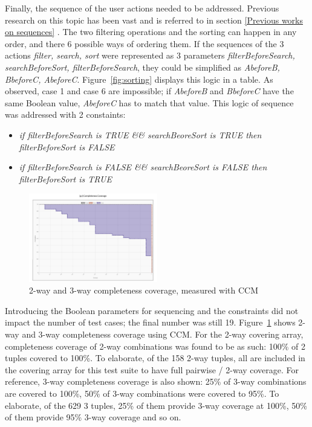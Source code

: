 \documentclass[conference]{IEEEtran}
\begin{document}
	Finally, the sequence of the user actions needed to be addressed. Previous research on this topic has been vast and is referred to in section \ref{Previous works on sequences} .
	The two filtering operations and the sorting can happen in any order, and there 6 possible ways of ordering them.
	If the sequences of the 3 actions \textit{filter, search, sort} were represented as 3 parameters \textit{filterBeforeSearch, searchBeforeSort, filterBeforeSearch}, they could be simplified as \textit{AbeforeB, BbeforeC, AbeforeC}.
	Figure~\ref{fig:sorting} displays this logic in a table.
	As observed, case 1 and case 6 are impossible; if \textit{AbeforeB} and \textit{BbeforeC} have the same Boolean value, \textit{AbeforeC} has to match that value.
	This logic of sequence was addressed with 2 constaints:

	\begin{itemize}
	\item \textit{if filterBeforeSearch is TRUE \&\& searchBeoreSort is TRUE then filterBeforeSort is FALSE}
	\item \textit{if filterBeforeSearch is FALSE \&\& searchBeoreSort is FALSE then filterBeforeSort is TRUE}
	\end{itemize}


	\begin{figure}[!h]
		\includegraphics[width=0.50\textwidth,]{CompletenessCoverage.pdf}
		\caption{2-way and 3-way completeness coverage, measured with CCM}
		\label{fig:CompletenessCoverage}
	\end{figure}


	Introducing the Boolean parameters for sequencing and the constraints did not impact the number of test cases; the final number was still 19.
	Figure~\ref{fig:CompletenessCoverage} shows 2-way and 3-way completeness coverage using CCM. 
	For the 2-way covering array, completeness coverage of 2-way combinations was found to be as such: 100\% of 2 tuples covered to 100\%. 
	To elaborate, of the 158 2-way tuples, all are included in the covering array for this test suite to have full pairwise / 2-way coverage.
	For reference, 3-way completeness coverage is also shown: 25\% of 3-way combinations are covered to 100\%, 50\% of 3-way combinations were covered to 95\%.
	To elaborate, of the 629 3 tuples, 25\% of them provide 3-way coverage at 100\%, 50\% of them provide 95\% 3-way coverage and so on.
\end{document}
